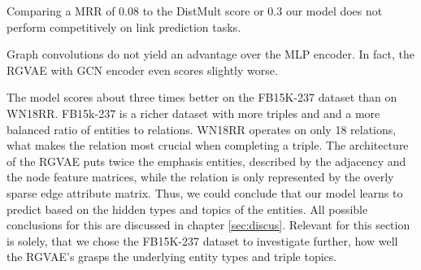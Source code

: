 Comparing a MRR of $0.08$ to the DistMult score or $0.3$ our model does not perform competitively on link prediction tasks.


Graph convolutions do not yield an advantage over the MLP encoder. In fact, the RGVAE with GCN encoder even scores slightly worse. 

The model scores about three times better on the FB15K-237 dataset than on WN18RR. FB15k-237 is a richer dataset with more triples and and a more balanced ratio of entities to relations. WN18RR operates on only 18 relations, what makes the relation most crucial when completing a triple. The architecture of the RGVAE puts twice the emphasis entities, described by the adjacency and the node feature matrices, while the relation is only represented by the overly sparse edge attribute matrix. Thus, we could conclude that our model learns to predict based on the hidden types and topics of the entities. All possible conclusions for this are discussed in chapter \ref{sec:discus}. Relevant for this section is solely, that we chose the FB15K-237 dataset to investigate further, how well the RGVAE's grasps the underlying entity types and triple topics.   



